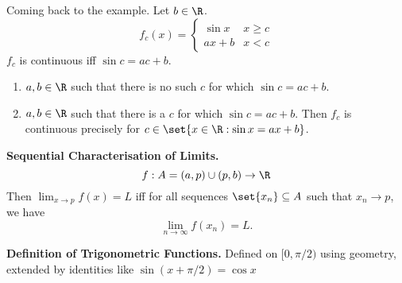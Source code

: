 Coming back to the example. Let $b \in \R$. \[
    f_{c}(x) = \begin{cases}
        \sin x & x \geq c \\
        ax + b & x < c
    \end{cases}
\] $f_{c}$ is continuous iff $\sin c = ac + b$.
\begin{enumerate}[label=(Case \arabic*)]
    \item $a, b \in \R$ such that there is no such $c$ for which $\sin c = ac + b$.
    \item $a, b \in \R$ such that there is a $c$ for which $\sin c = ac + b$. Then $f_{c}$ is continuous precisely for $c \in \set{x \in \R: \sin x = ax + b}$.
\end{enumerate}

\textbf{Sequential Characterisation of Limits.}
\[
    f : A = (a, p) \cup (p, b) \to \R
\] Then $\lim_{x \to p} f(x) = L$ iff for all sequences $\set{x_{n}} \subseteq A$ such that $x_{n} \to p$, we have \[
    \lim_{n \to \infty} f(x_{n}) = L.
\]

\textbf{Definition of Trigonometric Functions.}
Defined on $[0, \pi/2)$ using geometry, extended by identities like $\sin(x + \pi/2) = \cos x$
